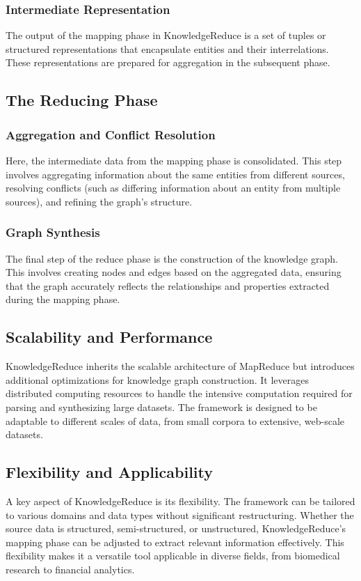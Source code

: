 \documentclass{article}
\begin{document}
\subsubsection{Intermediate Representation} 
The output of the mapping phase in KnowledgeReduce is a set of tuples or structured representations that encapsulate entities and their interrelations. These representations are prepared for aggregation in the subsequent phase.
\subsection{The Reducing Phase}
\subsubsection{Aggregation and Conflict Resolution}
Here, the intermediate data from the mapping phase is consolidated. This step involves aggregating information about the same entities from different sources, resolving conflicts (such as differing information about an entity from multiple sources), and refining the graph's structure.
\subsubsection{Graph Synthesis} 
The final step of the reduce phase is the construction of the knowledge graph. This involves creating nodes and edges based on the aggregated data, ensuring that the graph accurately reflects the relationships and properties extracted during the mapping phase.
\subsection{Scalability and Performance}
KnowledgeReduce inherits the scalable architecture of MapReduce but introduces additional optimizations for knowledge graph construction. It leverages distributed computing resources to handle the intensive computation required for parsing and synthesizing large datasets. The framework is designed to be adaptable to different scales of data, from small corpora to extensive, web-scale datasets.

\subsection{Flexibility and Applicability}
A key aspect of KnowledgeReduce is its flexibility. The framework can be tailored to various domains and data types without significant restructuring. Whether the source data is structured, semi-structured, or unstructured, KnowledgeReduce's mapping phase can be adjusted to extract relevant information effectively. This flexibility makes it a versatile tool applicable in diverse fields, from biomedical research to financial analytics.
\end{document}
